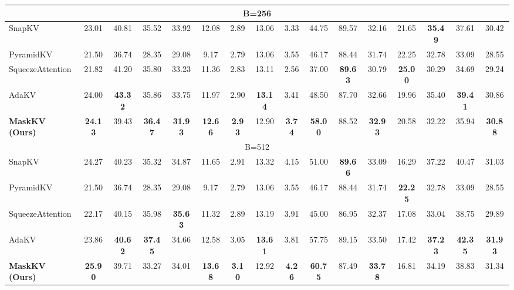 \begin{table*}[t!]
{\begin{tabular}{@{}l*{15}{c}@{}}
        \midrule
        \multicolumn{16}{c}{\small B=256} \\
        \midrule
        SnapKV & 23.01 & 40.81 & 35.52 & 33.92 & 12.08 & 2.89 & 13.06 & 3.33 & 44.75 & 89.57 & 32.16 & 21.65 & \textbf{35.49} & 37.61 & 30.42 \\
        PyramidKV & 21.50 & 36.74 & 28.35 & 29.08 & 9.17 & 2.79 & 13.06 & 3.55 & 46.17 & 88.44 & 31.74 & 22.25 & 32.78 & 33.09 & 28.55 \\
        SqueezeAttention & 21.82 & 41.20 & 35.80 & 33.23 & 11.36 & 2.83 & 13.11 & 2.56 & 37.00 & \textbf{89.63} & 30.79 & \textbf{25.00} & 30.29 & 34.69 & 29.24 \\
        AdaKV & 24.00 & \textbf{43.32} & 35.86 & 33.75 & 11.97 & 2.90 & \textbf{13.14} & 3.41 & 48.50 & 87.70 & 32.66 & 19.96 & 35.40 & \textbf{39.41} & 30.86 \\
        \rowcolor{lightgreen} \textbf{MaskKV (Ours)} & \textbf{24.13} & 39.43 & \textbf{36.47} & \textbf{31.93} & \textbf{12.66} & \textbf{2.93} & 12.90 & \textbf{3.74} & \textbf{58.00} & 88.52 & \textbf{32.93} & 20.58 & 32.22 & 35.94 & \textbf{30.88} \\
        \midrule
        \multicolumn{16}{c}{\small B=512} \\
        \midrule
        SnapKV & 24.27 & 40.23 & 35.32 & 34.87 & 11.65 & 2.91 & 13.32 & 4.15 & 51.00 & \textbf{89.66} & 33.09 & 16.29 & 37.22 & 40.47 & 31.03 \\
        PyramidKV & 21.50 & 36.74 & 28.35 & 29.08 & 9.17 & 2.79 & 13.06 & 3.55 & 46.17 & 88.44 & 31.74 & \textbf{22.25} & 32.78 & 33.09 & 28.55 \\
        SqueezeAttention & 22.17 & 40.15 & 35.98 & \textbf{35.63} & 11.32 & 2.89 & 13.19 & 3.91 & 45.00 & 86.95 & 32.37 & 17.08 & 33.04 & 38.75 & 29.89 \\
        AdaKV & 23.86 & \textbf{40.62} & \textbf{37.45} & 34.66 & 12.58 & 3.05 & \textbf{13.61} & 3.81 & 57.75 & 89.15 & 33.50 & 17.42 & \textbf{37.23} & \textbf{42.35} & \textbf{31.93} \\
        \rowcolor{lightgreen} \textbf{MaskKV (Ours)} & \textbf{25.90} & 39.71 & 33.27 & 34.01 & \textbf{13.68} & \textbf{3.10} & 12.92 & \textbf{4.26} & \textbf{60.75} & 87.49 & \textbf{33.78} & 16.81 & 34.19 & 38.83 & 31.34 \\

        \bottomrule
    \end{tabular}
    } 
\end{table*}